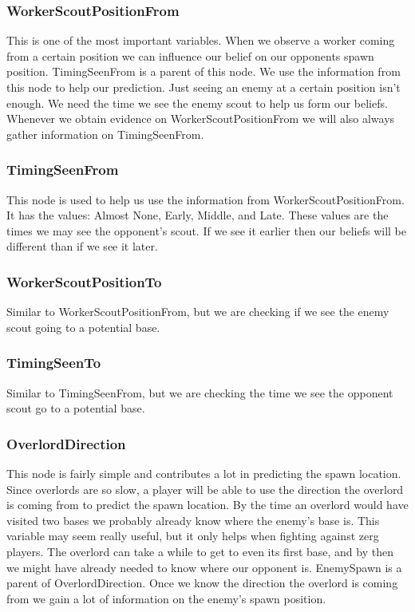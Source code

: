 \subsubsection*{WorkerScoutPositionFrom} This is one of the most important variables. When we observe a worker coming from a certain position we can influence our belief on our opponents spawn position. TimingSeenFrom is a parent of this node. We use the information from this node to help our prediction. Just seeing an enemy at a certain position isn't enough. We need the time we see the enemy scout to help us form our beliefs. Whenever we obtain evidence on WorkerScoutPositionFrom we will also always gather information on TimingSeenFrom.

\subsubsection*{TimingSeenFrom} This node is used to help us use the information from WorkerScoutPositionFrom. It has the values: Almost None, Early, Middle, and Late. These values are the times we may see the opponent's scout. If we see it earlier then our beliefs will be different than if we see it later.

\subsubsection*{WorkerScoutPositionTo} Similar to WorkerScoutPositionFrom, but we are checking if we see the enemy scout going to a potential base.

\subsubsection*{TimingSeenTo} Similar to TimingSeenFrom, but we are checking the time we see the opponent scout go to a potential base.

\subsubsection*{OverlordDirection} This node is fairly simple and contributes a lot in predicting the spawn location. Since overlords are so slow, a player will be able to use the direction the overlord is coming from to predict the spawn location. By the time an overlord would have visited two bases we probably already know where the enemy's base is. This variable may seem really useful, but it only helps when fighting against zerg players. The overlord can take a while to get to even its first base, and by then we might have already needed to know where our opponent is. EnemySpawn is a parent of OverlordDirection. Once we know the direction the overlord is coming from we gain a lot of information on the enemy's spawn position.


